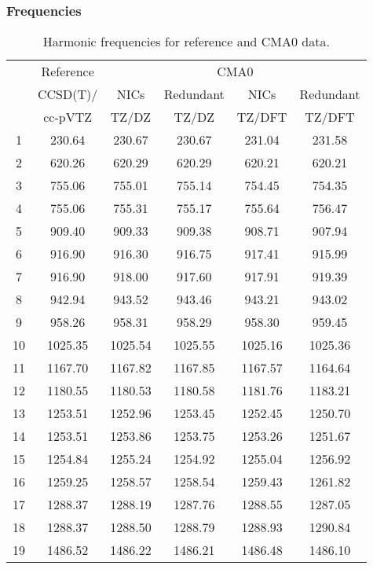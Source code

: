 \documentclass[10pt,oneside]{article}
\begin{document}
\begin{table}[h!]
\subsubsection*{Frequencies}
\centering
\caption{Harmonic frequencies for reference and CMA0 data.}
\begin{tabular}{cccccc}
\toprule
{} & Reference & \multicolumn{4}{c}{CMA0} \\
{} &  CCSD(T)/ &    NICs &  Redundant &    NICs & Redundant \\
{} &   cc-pVTZ &   TZ/DZ &      TZ/DZ &  TZ/DFT &    TZ/DFT \\
\midrule
1  &    230.64 &  230.67 &     230.67 &  231.04 &    231.58 \\
2  &    620.26 &  620.29 &     620.29 &  620.21 &    620.21 \\
3  &    755.06 &  755.01 &     755.14 &  754.45 &    754.35 \\
4  &    755.06 &  755.31 &     755.17 &  755.64 &    756.47 \\
5  &    909.40 &  909.33 &     909.38 &  908.71 &    907.94 \\
6  &    916.90 &  916.30 &     916.75 &  917.41 &    915.99 \\
7  &    916.90 &  918.00 &     917.60 &  917.91 &    919.39 \\
8  &    942.94 &  943.52 &     943.46 &  943.21 &    943.02 \\
9  &    958.26 &  958.31 &     958.29 &  958.30 &    959.45 \\
10 &   1025.35 & 1025.54 &    1025.55 & 1025.16 &   1025.36 \\
11 &   1167.70 & 1167.82 &    1167.85 & 1167.57 &   1164.64 \\
12 &   1180.55 & 1180.53 &    1180.58 & 1181.76 &   1183.21 \\
13 &   1253.51 & 1252.96 &    1253.45 & 1252.45 &   1250.70 \\
14 &   1253.51 & 1253.86 &    1253.75 & 1253.26 &   1251.67 \\
15 &   1254.84 & 1255.24 &    1254.92 & 1255.04 &   1256.92 \\
16 &   1259.25 & 1258.57 &    1258.54 & 1259.43 &   1261.82 \\
17 &   1288.37 & 1288.19 &    1287.76 & 1288.55 &   1287.05 \\
18 &   1288.37 & 1288.50 &    1288.79 & 1288.93 &   1290.84 \\
19 &   1486.52 & 1486.22 &    1486.21 & 1486.48 &   1486.10 \\

\end{tabular}
\end{table}
\end{document}
